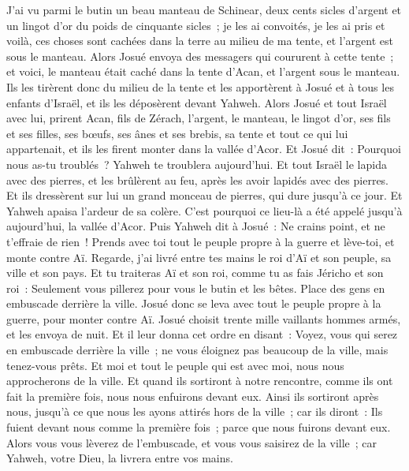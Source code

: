 \begin{multicols}{2}
J'ai vu parmi le butin un beau manteau de Schinear, deux cents sicles d'argent et un lingot d'or du poids de cinquante sicles~; je les ai convoités, je les ai pris et voilà, ces choses sont cachées dans la terre au milieu de ma tente, et l'argent est sous le manteau.
Alors Josué envoya des messagers qui coururent à cette tente~; et voici, le manteau était caché dans la tente d'Acan, et l'argent sous le manteau.
Ils les tirèrent donc du milieu de la tente et les apportèrent à Josué et à tous les enfants d'Israël, et ils les déposèrent devant Yahweh.
Alors Josué et tout Israël avec lui, prirent Acan, fils de Zérach, l'argent, le manteau, le lingot d'or, ses fils et ses filles, ses bœufs, ses ânes et ses brebis, sa tente et tout ce qui lui appartenait, et ils les firent monter dans la vallée d'Acor.
Et Josué dit~: Pourquoi nous as-tu troublés~? Yahweh te troublera aujourd'hui. Et tout Israël le lapida avec des pierres, et les brûlèrent au feu, après les avoir lapidés avec des pierres.
Et ils dressèrent sur lui un grand monceau de pierres, qui dure jusqu'à ce jour. Et Yahweh apaisa l'ardeur de sa colère. C'est pourquoi ce lieu-là a été appelé jusqu'à aujourd'hui, la vallée d'Acor.
\VerseOne{}Puis Yahweh dit à Josué~: Ne crains point, et ne t'effraie de rien~! Prends avec toi tout le peuple propre à la guerre et lève-toi, et monte contre Aï. Regarde, j'ai livré entre tes mains le roi d'Aï et son peuple, sa ville et son pays.
Et tu traiteras Aï et son roi, comme tu as fais Jéricho et son roi~: Seulement vous pillerez pour vous le butin et les bêtes. Place des gens en embuscade derrière la ville.
Josué donc se leva avec tout le peuple propre à la guerre, pour monter contre Aï. Josué choisit trente mille vaillants hommes armés, et les envoya de nuit.
Et il leur donna cet ordre en disant~: Voyez, vous qui serez en embuscade derrière la ville~; ne vous éloignez pas beaucoup de la ville, mais tenez-vous prêts.
Et moi et tout le peuple qui est avec moi, nous nous approcherons de la ville. Et quand ils sortiront à notre rencontre, comme ils ont fait la première fois, nous nous enfuirons devant eux.
Ainsi ils sortiront après nous, jusqu'à ce que nous les ayons attirés hors de la ville~; car ils diront~: Ils fuient devant nous comme la première fois~; parce que nous fuirons devant eux.
Alors vous vous lèverez de l'embuscade, et vous vous saisirez de la ville~; car Yahweh, votre Dieu, la livrera entre vos mains.

\end{multicols}
